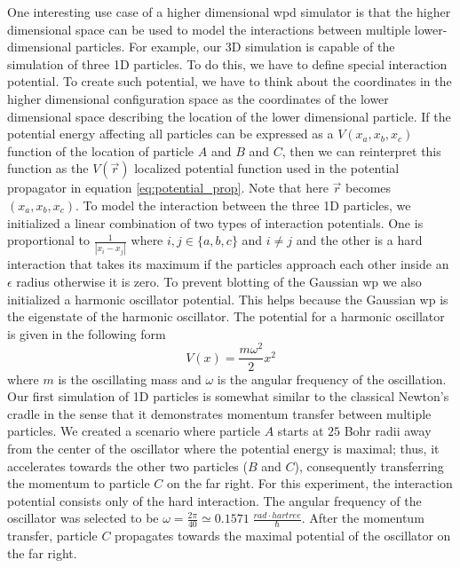 One interesting use case of a higher dimensional \acrshort{wpd} simulator is that the higher dimensional space can be used to model the interactions between multiple lower-dimensional particles.
For example, our 3D simulation is capable of the simulation of three 1D particles.
To do this, we have to define special interaction potential.
To create such potential, we have to think about the coordinates in the higher dimensional configuration space as the coordinates of the lower dimensional space describing the location of the lower dimensional particle.
If the potential energy affecting all particles can be expressed as a $V(x_a, x_b, x_c)$ function of the location of particle $A$ and $B$ and $C$, then we can reinterpret this function as the $V(\vec{r})$ localized potential function used in the potential propagator in equation \ref{eq:potential_prop}.
Note that here $\vec{r}$ becomes $(x_a, x_b, x_c)$.
To model the interaction between the three 1D particles, we initialized a linear combination of two types of interaction potentials.
One is proportional to $\frac{1}{|x_i - x_j|}$ where $i,j\in\{a,b,c\}$ and $i\neq j$ and the other is a hard interaction that takes its maximum if the particles approach each other inside an $\epsilon$ radius otherwise it is zero.
To prevent blotting of the Gaussian \acrshort{wp} we also initialized a harmonic oscillator potential.
This helps because the Gaussian \acrshort{wp} is the eigenstate of the harmonic oscillator.
The potential for a harmonic oscillator is given in the following form
\begin{equation}
	\label{eq:harmonic_osc}
	V(x) = \frac{m\omega^2}{2}x^2
\end{equation}
where $m$ is the oscillating mass and $\omega$ is the angular frequency of the oscillation.
Our first simulation of 1D particles is somewhat similar to the classical Newton's cradle \cite{}
in the sense that it demonstrates momentum transfer between multiple particles.
We created a scenario where particle $A$ starts at $25$ Bohr radii away from the center of the oscillator where the potential energy is maximal; thus, it accelerates towards the other two particles ($B$ and $C$), consequently transferring the momentum to particle $C$ on the far right.
For this experiment, the interaction potential consists only of the hard interaction.
The angular frequency of the oscillator was selected to be $\omega = \frac{2\pi}{40} \simeq 0.1571\; \frac{rad\cdot hartree}{\hbar}$.
After the momentum transfer, particle $C$ propagates towards the maximal potential of the oscillator on the far right.
